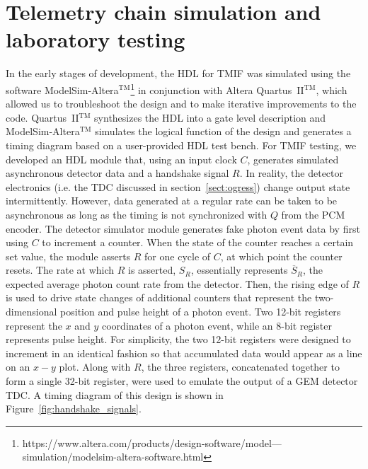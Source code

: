 \documentclass{ws-jai}
\begin{document}
\section{Telemetry chain simulation and laboratory testing}
\label{sect:lab_testing}
In the early stages of development, the HDL for TMIF was simulated using the software ModelSim-Altera$^{\text{TM}}$\footnote{https://www.altera.com/products/design-software/model---simulation/modelsim-altera-software.html} in conjunction with Altera Quartus~II$^\text{TM}$, which allowed us to troubleshoot the design and to make iterative improvements to the code. Quartus~II$^\text{TM}$ synthesizes the HDL into a gate level description and ModelSim-Altera$^{\text{TM}}$ simulates the logical function of the design and generates a timing diagram based on a user-provided HDL test bench. For TMIF testing, we developed an HDL module that, using an input clock $C$, generates simulated asynchronous detector data and a handshake signal $R$. In reality, the detector electronics (i.e. the TDC discussed in section~\ref{sect:ogress}) change output state intermittently. However, data generated at a regular rate can be taken to be asynchronous as long as the timing is not synchronized with $Q$ from the PCM encoder. The detector simulator module generates fake photon event data by first using $C$ to increment a counter. When the state of the counter reaches a certain set value, the module asserts $R$ for one cycle of $C$, at which point the counter resets. The rate at which $R$ is asserted, $S_R$, essentially represents $\overline{S}_R$, the expected average photon count rate from the detector. Then, the rising edge of $R$ is used to drive state changes of additional counters that represent the two-dimensional position and pulse height of a photon event. Two 12-bit registers represent the $x$ and $y$ coordinates of a photon event, while an 8-bit register represents pulse height. For simplicity, the two 12-bit registers were designed to increment in an identical fashion so that accumulated data would appear as a line on an $x-y$ plot. Along with $R$, the three registers, concatenated together to form a single 32-bit register, were used to emulate the output of a GEM detector TDC. A timing diagram of this design is shown in Figure~\ref{fig:handshake_signals}.
\end{document}
